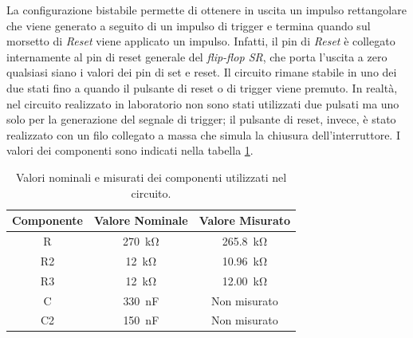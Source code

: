 \noindent
La configurazione bistabile permette di ottenere in uscita un impulso rettangolare che viene generato a seguito di un impulso di trigger e termina quando sul morsetto di \textit{Reset} viene applicato un impulso. Infatti, il pin di \textit{Reset} è collegato internamente al pin di reset generale del \textit{flip-flop SR}, che porta l'uscita a zero qualsiasi siano i valori dei pin di set e reset. Il circuito rimane stabile in uno dei due stati fino a quando il pulsante di reset o di trigger viene premuto. In realtà, nel circuito realizzato in laboratorio non sono stati utilizzati due pulsati ma uno solo per la generazione del segnale di trigger; il pulsante di reset, invece, è stato realizzato con un filo collegato a massa che simula la chiusura dell'interruttore. I valori dei componenti sono indicati nella tabella \ref{tab:valori_componenti_2}.
\def\arraystretch{1.3}
\begin{table}[h!]
	\centering
	\begin{tabular}{|c|c|c|}
		\hline
		Componente	& Valore Nominale & Valore Misurato \\ \hline
		R &\SI{270}{\kilo\ohm} & \SI{265.8}{\kilo\ohm} \\ \hline
		R2 &\SI{12}{\kilo\ohm} & \SI{10.96}{\kilo\ohm} \\ \hline
		R3 & \SI{12}{\kilo\ohm} & \SI{12.00}{\kilo\ohm} \\ \hline
		C & \SI{330}{\nano\farad} & Non misurato \\ \hline
		C2 & \SI{150}{\nano\farad} & Non misurato \\ \hline
	\end{tabular}
	\caption{Valori nominali e misurati dei componenti utilizzati nel circuito.}
	\label{tab:valori_componenti_2}
\end{table}

